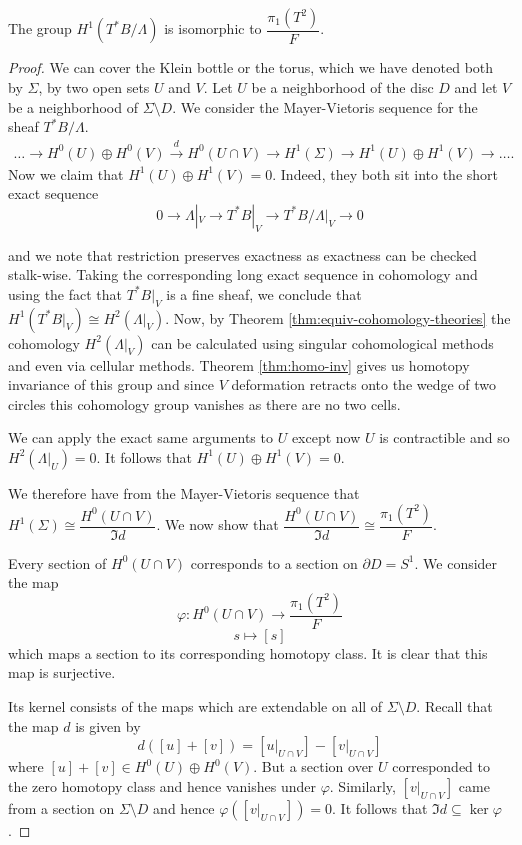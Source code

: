 \begin{lemma}\label{lemma:quotient-chern-class}
    The group $H^1(T^*B/\Lambda)$ is isomorphic to $\dfrac{\pi_1(T^2)}{F}$.
\end{lemma}
\begin{proof}

    We can cover the Klein bottle or the torus, which we have denoted both by
    $\Sigma$, by two open sets $U$ and $V$. Let $U$ be a neighborhood of the disc
    $D$ and let $V$ be a neighborhood of $\Sigma \setminus D$. We consider the
    Mayer-Vietoris sequence for the sheaf $T^*B/\Lambda$.
    \begin{align*}
        \dots \to H^0(U) \oplus H^0(V) \xrightarrow{d} H^0(U \cap V) \to H^1(\Sigma) \to H^1(U) \oplus H^1(V) \to \dots .
    \end{align*}
    Now we claim that $H^1(U) \oplus H^1(V) = 0$. Indeed, they both sit into the short exact sequence
    $$
        0 \to \Lambda|_V \to T^*B|_V \to T^*B/\Lambda|_V \to 0
    $$

    and we note that restriction preserves exactness as exactness can be checked
    stalk-wise. Taking the corresponding long exact sequence in cohomology and
    using the fact that $T^*B|_V$ is a fine sheaf, we conclude that $H^1(T^*B|_V)
        \cong H^2(\Lambda|_V)$. Now, by Theorem \ref{thm:equiv-cohomology-theories} the
    cohomology $H^2(\Lambda|_V)$ can be calculated using singular cohomological
    methods and even via cellular methods. Theorem \ref{thm:homo-inv} gives us
    homotopy invariance of this group and since $V$ deformation retracts onto the
    wedge of two circles this cohomology group vanishes as there are no two cells.

    We can apply the exact same arguments to $U$ except now $U$ is contractible and
    so $H^2(\Lambda|_U)=0$. It follows that $H^1(U) \oplus H^1(V) = 0$.

    We therefore have from the Mayer-Vietoris sequence that $H^1(\Sigma) \cong
        \dfrac{H^0(U \cap V)}{\Im d}$. We now show that $\dfrac{H^0(U \cap V)}{\Im d}
        \cong \dfrac{\pi_1(T^2)}{F}$.

    Every section of $H^0(U \cap V)$ corresponds to a section on $\partial D =
        S^1$. We consider the map $$ \varphi: H^0(U \cap V) \to \dfrac{\pi_1(T^2)}{F}
    $$ $$ s \mapsto [s] $$ which maps a section to its corresponding homotopy
    class. It is clear that this map is surjective.

    Its kernel consists of the maps which are extendable on all of $\Sigma
        \setminus D$. Recall that the map $d$ is given by $$ d([u] + [v]) = [u|_{U \cap
        V}]- [v|_{U \cap V}] $$ where $[u] + [v] \in H^0(U) \oplus H^0(V)$. But a
    section over $U$ corresponded to the zero homotopy class and hence vanishes
    under $\varphi$. Similarly, $[v|_{U \cap V}]$ came from a section on $\Sigma
        \setminus D$ and hence $\varphi([v|_{U \cap V}]) = 0$. It follows that $\Im d
        \subseteq \ker \varphi$.


\end{proof}
